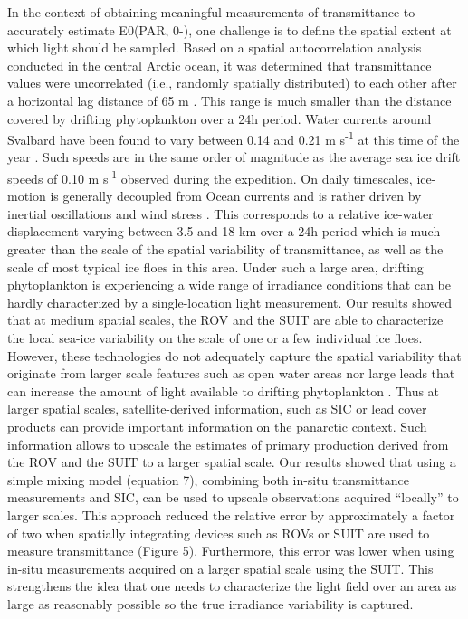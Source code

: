 In the context of obtaining meaningful measurements of transmittance to accurately estimate E0(PAR, 0-), one challenge is to define the spatial extent at which light should be sampled. Based on a spatial autocorrelation analysis conducted in the central Arctic ocean, it was determined that transmittance values were uncorrelated (i.e., randomly spatially distributed) to each other after a horizontal lag distance of 65 m \citep{Lange2017b}. This range is much smaller than the distance covered by drifting phytoplankton over a 24h period. Water currents around Svalbard have been found to vary between 0.14 and 0.21 m s\textsuperscript{-1} at this time of the year \citep{Meyer2017}. Such speeds are in the same order of magnitude as  the average sea ice drift speeds of 0.10 m s\textsuperscript{-1} observed during the expedition. On daily timescales, ice-motion is generally decoupled from Ocean currents and is rather driven by inertial oscillations and wind stress \citep{Park2016}. This corresponds to a relative ice-water displacement varying between 3.5 and 18 km over a 24h period which is much greater than the scale of the spatial variability of transmittance, as well as the scale of most typical ice floes in this area. Under such a large area, drifting phytoplankton is experiencing a wide range of irradiance conditions that can be hardly characterized by a single-location light measurement. Our results showed that at medium spatial scales, the ROV and the SUIT are able to characterize the local sea-ice variability on the scale of one or a few individual ice floes. However, these technologies do not adequately capture the spatial variability that originate from larger scale features such as open water areas nor large leads that can increase the amount of light available to drifting phytoplankton \citep{Assmy2017}. Thus at larger spatial scales, satellite-derived information, such as SIC or lead cover products can provide important information on the panarctic context. Such information allows to upscale the estimates of primary production derived from the ROV and the SUIT to a larger spatial scale. Our results showed that using a simple mixing model (equation 7), combining both in-situ transmittance measurements and SIC, can be used to upscale observations acquired “locally” to larger scales. This approach reduced the relative error by approximately a factor of two when spatially integrating devices such as ROVs or SUIT are used to measure transmittance (Figure 5). Furthermore, this error was lower when using in-situ measurements acquired on a larger spatial scale using the SUIT. This strengthens the idea that one needs to characterize the light field over an area as large as reasonably possible so the true irradiance variability is captured.

